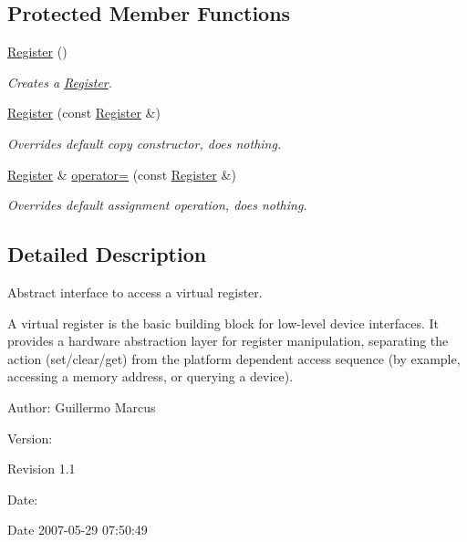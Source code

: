 \subsection*{Protected Member Functions}
\begin{CompactItemize}
\item 
\hyperlink{classmprace_1_1Register_b0}{Register} ()
\begin{CompactList}\small\item\em Creates a \hyperlink{classmprace_1_1Register}{Register}. \item\end{CompactList}\item 
\hyperlink{classmprace_1_1Register_b1}{Register} (const \hyperlink{classmprace_1_1Register}{Register} \&)
\begin{CompactList}\small\item\em Overrides default copy constructor, does nothing. \item\end{CompactList}\item 
\hyperlink{classmprace_1_1Register}{Register} \& \hyperlink{classmprace_1_1Register_b2}{operator=} (const \hyperlink{classmprace_1_1Register}{Register} \&)
\begin{CompactList}\small\item\em Overrides default assignment operation, does nothing. \item\end{CompactList}\end{CompactItemize}


\subsection{Detailed Description}
Abstract interface to access a virtual register. 

A virtual register is the basic building block for low-level device interfaces. It provides a hardware abstraction layer for register manipulation, separating the action (set/clear/get) from the platform dependent access sequence (by example, accessing a memory address, or querying a device).

\begin{Desc}
\item[Author:]Guillermo Marcus \end{Desc}
\begin{Desc}
\item[Version:]\begin{Desc}
\item[Revision]1.1 \end{Desc}
\end{Desc}
\begin{Desc}
\item[Date:]\begin{Desc}
\item[Date]2007-05-29 07:50:49 \end{Desc}
\end{Desc}





